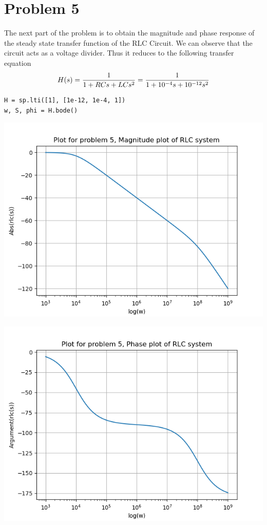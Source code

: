 \documentclass[12pt, a4paper]{report}
\begin{document}
\section*{Problem 5}
The next part of the problem is to obtain the magnitude and phase response of the steady state transfer function of the RLC Circuit. We can observe that the circuit acts as a voltage divider. Thus it reduces to the following transfer equation
\begin{equation*}
H(s) = \frac{1}{1 + RCs + LCs^2} = \frac{1}{1 + 10^{-4}s + 10^{-12}s^2}\\
\end{equation*}

\begin{verbatim}
H = sp.lti([1], [1e-12, 1e-4, 1])
w, S, phi = H.bode()
\end{verbatim}

\begin{center}
	\includegraphics[scale=0.8]{5a.png} 
	\label{fig:rawdata}
\end{center}

\begin{center}
	\includegraphics[scale=0.8]{5b.png} 
	\label{fig:rawdata}
\end{center}
\end{document}
